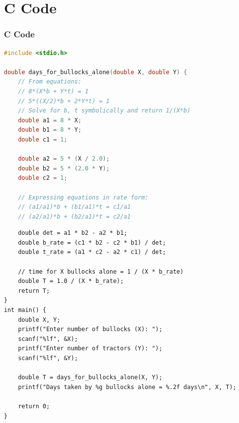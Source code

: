 \documentclass{beamer}
\theoremstyle{remark}
\numberwithin{equation}{section}
\numberwithin{equation}{section}
\begin{document}
\section{C Code}
\begin{frame}[fragile]
\frametitle{C Code }
\begin{lstlisting}[language=C]
#include <stdio.h>

double days_for_bullocks_alone(double X, double Y) {
    // From equations:
    // 8*(X*b + Y*t) = 1
    // 5*((X/2)*b + 2*Y*t) = 1
    // Solve for b, t symbolically and return 1/(X*b)
    double a1 = 8 * X;
    double b1 = 8 * Y;
    double c1 = 1;

    double a2 = 5 * (X / 2.0);
    double b2 = 5 * (2.0 * Y);
    double c2 = 1;

    // Expressing equations in rate form:
    // (a1/a1)*b + (b1/a1)*t = c1/a1
    // (a2/a1)*b + (b2/a1)*t = c2/a1
\end{lstlisting}
\end{frame}
\begin{frame}[fragile]
\begin{lstlisting}
    double det = a1 * b2 - a2 * b1;
    double b_rate = (c1 * b2 - c2 * b1) / det;
    double t_rate = (a1 * c2 - a2 * c1) / det;

    // time for X bullocks alone = 1 / (X * b_rate)
    double T = 1.0 / (X * b_rate);
    return T;
}
int main() {
    double X, Y;
    printf("Enter number of bullocks (X): ");
    scanf("%lf", &X);
    printf("Enter number of tractors (Y): ");
    scanf("%lf", &Y);

    double T = days_for_bullocks_alone(X, Y);
    printf("Days taken by %g bullocks alone = %.2f days\n", X, T);

    return 0;
}

\end{lstlisting}
\end{frame}
\end{document}
